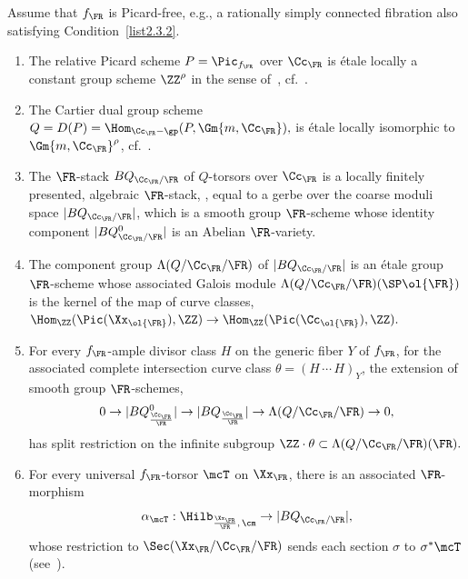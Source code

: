 \begin{rema}\label{rmk-Zhu}
Assume that $f_\FR$ is Picard-free, e.g., a rationally simply connected fibration also satisfying Condition~\eqref{list2.3.2}.
\begin{enumerate}\romanenumi
\item \label{list2.4.1}The relative Picard scheme $P=\Pic_{f_\FR}$ over $\Cc_\FR$ is étale locally a constant group scheme $\ZZ^\rho$ in the sense of~\cite[Definition~X.5.1]{SGA3II}, cf.~\cite[Proposition~2.9]{Zhu}.
\item \label{list2.4.2}The Cartier dual group scheme $Q=D(P)=
\Hom_{\Cc_\FR-\gp}(P,\Gm{m,\Cc_\FR}),$ is étale locally isomorphic to $\Gm{m,\Cc_\FR}^\rho$, cf.~\cite[Proposition~X.5.3]{SGA3II}.
\item \label{list2.4.3}The $\FR$-stack $BQ_{\Cc_\FR/\FR}$ of $Q$-torsors over $\Cc_\FR$ is a locally finitely presented, algebraic $\FR$-stack, \cite[Proposition~2.3.4]{Lieblich}, equal to a gerbe over the coarse moduli space $|BQ_{\Cc_\FR/\FR}|$, which is a smooth group $\FR$-scheme whose identity component $|BQ^0_{\Cc_\FR/\FR}|$ is an Abelian $\FR$-variety.
\item \label{list2.4.4}The component group $\Lambda(Q/\Cc_\FR/\FR)$ of $|BQ_{\Cc_\FR/\FR}|$ is an étale group $\FR$-scheme whose associated Galois module $\Lambda(Q/\Cc_\FR/\FR)(\SP \ol{\FR})$ is the kernel of the map of curve classes, $\Hom_\ZZ(\Pic(\Xx_{\ol{\FR}}),\ZZ) \to
\Hom_\ZZ(\Pic(\Cc_{\ol{\FR}}),\ZZ).$
\item \label{list2.4.5}For every $f_\FR$-ample divisor class $H$ on the generic fiber $Y$ of $f_\FR$, for the associated complete intersection curve class $\theta=(H\,\cdots\,H)_Y$,
the extension of smooth group $\FR$-schemes,
\[
0\to
|BQ^0_{\frac{\Cc_{\FR}}{\FR}}| \to |BQ_{\frac{\Cc_{\FR}}{\FR}}| \to \Lambda(Q/\Cc_\FR/\FR)
\to 0,
\]
has split restriction on the infinite subgroup $\ZZ\cdot \theta \subset \Lambda(Q/\Cc_\FR/\FR)(\FR).$
\item \label{list2.4.6}For every universal $f_\FR$-torsor $\mcT$ on $\Xx_\FR$,
there is an associated $\FR$-morphism
\[
\alpha_\mcT:
\Hilb_{\frac{\Xx_\FR}{\FR},\,\cm} \to |BQ_{\Cc_\FR/\FR}|,
\]
whose
restriction to $\Sec(\Xx_\FR/\Cc_\FR/\FR)$ sends each section $\sigma$ to $\sigma^*\mcT$ (see~\cite[Proposition~3.3]{Zhu}).
\end{enumerate}
\end{rema}

